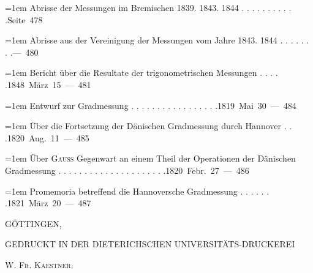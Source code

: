 \par{}%
\begingroup\fontsize{10.5}{13}\selectfont{}
\par\noindent\hangindent=1em Abrisse der Messungen im Bremischen 1839. 1843. 1844 . . . . . . . . . . .\hfill{}\hbox{}\nobreak\hfill\mbox{Seite 478}\par
\par\noindent\hangindent=1em Abrisse aus der Vereinigung der Messungen vom Jahre 1843. 1844 . . . . . . . .\hfill{}\hbox{}\nobreak\hfill\mbox{— 480}\par
\par\noindent\hangindent=1em Bericht über die Resultate der trigonometrischen Messungen . . . . .\hfill{}\hbox{}\nobreak\hfill\mbox{1848 März 15 — 481}\par
\par\noindent\hangindent=1em Entwurf zur Gradmessung . . . . . . . . . . . . . . . . .\hfill{}\hbox{}\nobreak\hfill\mbox{1819 Mai 30 — 484}\par
\par\noindent\hangindent=1em Über die Fortsetzung der Dänischen Gradmessung durch Hannover . . .\hfill{}\hbox{}\nobreak\hfill\mbox{1820 Aug. 11 — 485}\par
\par\noindent\hangindent=1em Über \textsc{Gauss} Gegenwart an einem Theil der Operationen der Dänischen Gradmessung . . . . . . . . . . . . . . . . . . . . .\hfill{}\hbox{}\nobreak\hfill\mbox{1820 Febr. 27 — 486}\par
\par\noindent\hangindent=1em Promemoria betreffend die Hannoversche Gradmessung . . . . . . .\hfill{}\hbox{}\nobreak\hfill\mbox{1821 März 20 — 487}\par
\endgroup
\par\bigskip{}\begin{center}GÖTTINGEN,\par\medskip GEDRUCKT IN DER DIETERICHSCHEN UNIVERSITÄTS-DRUCKEREI\par\medskip\textsc{W. Fr. Kaestner.}\end{center}
